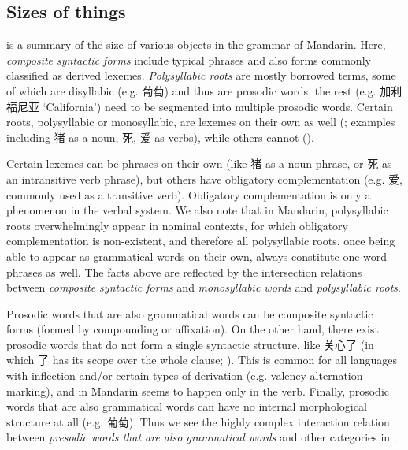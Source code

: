 \documentclass[UTF8, a4paper, oneside, scheme=plain, 12pt]{ctexrep}
\newcommand*{\term}[1]{\emph{#1}}
\newcommand{\translate}[1]{`#1'}
\begin{document}
\subsection{Sizes of things}\label{sec:grammatical.lexicon.size-of-things}

 is a summary of the size of various objects in the grammar of Mandarin.
Here, \term{composite syntactic forms} include typical phrases and
also forms commonly classified as derived lexemes.
\term{Polysyllabic roots} are mostly borrowed terms,
some of which are disyllabic (e.g. 葡萄) and thus are prosodic words,
the rest (e.g. 加利福尼亚 \translate{California}) need to be segmented into multiple prosodic words.
Certain roots, polysyllabic or monosyllabic, are lexemes on their own as well
(;
examples including 猪 as a noun, 死, 爱 as verbs),
while others cannot ().

Certain lexemes can be phrases on their own
(like 猪 as a noun phrase, or 死 as an intransitive verb phrase),
but others have obligatory complementation (e.g. 爱, commonly used as a transitive verb).
Obligatory complementation is only a phenomenon in the verbal system.
We also note that in Mandarin, polysyllabic roots overwhelmingly appear in nominal contexts,
for which obligatory complementation is non-existent,
and therefore all polysyllabic roots,
once being able to appear as grammatical words on their own,
always constitute one-word phrases as well.
The facts above are reflected by the intersection relations between \term{composite syntactic forms}
and \term{monosyllabic words} and \term{polysyllabic roots}.

Prosodic words that are also grammatical words can be composite syntactic forms
(formed by compounding or affixation).
On the other hand, there exist prosodic words that do not form a single syntactic structure,
like 关心了 (in which 了 has its scope over the whole clause; ).
This is common for all languages with inflection and/or certain types of derivation (e.g. valency alternation marking),
and in Mandarin seems to happen only in the verb.
Finally, prosodic words that are also grammatical words 
can have no internal morphological structure at all (e.g. 葡萄).
Thus we see the highly complex interaction relation between \term{presodic words that are also grammatical words}
and other categories in .
\end{document}

